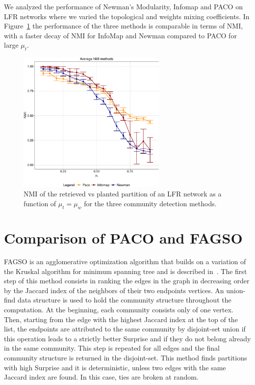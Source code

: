 We analyzed the performance of Newman's Modularity, Infomap and PACO on LFR networks where we varied the topological and weights mixing coefficients.
In Figure~\ref{fig:avgmutmuw} the performance of the three methods is comparable in terms of NMI, with a faster decay of NMI for InfoMap and Newman compared to PACO for large $\mu_t$.

\begin{figure}[htb!]
\centering
\includegraphics[width=0.65\textwidth]{images/avg_nmi_allmethods_lfr_errorbars.pdf}
\caption{NMI of the retrieved vs planted partition of an LFR network as a function of $\mu_t=\mu_w$ for the three community detection methods.}
\label{fig:avgmutmuw}
\end{figure}

\section{Comparison of PACO and FAGSO}
FAGSO is an agglomerative optimization algorithm that builds on a variation of the Kruskal algorithm for minimum spanning tree and is described in~\cite{nicolini2016}. The first step of this method consists in ranking the edges in the graph in decreasing order by the Jaccard index of the neighbors of their two endpoints vertices. An union-find data structure is used to hold the community structure throughout the computation. At the beginning, each community consists only of one vertex. Then, starting from the edge with the highest Jaccard index at the top of the list, the endpoints are attributed to the same community by disjoint-set union if this operation leads to a strictly better Surprise and if they do not belong already in the same community. This step is repeated for all edges and the final community structure is returned in the disjoint-set. This method finds partitions with high Surprise and it is deterministic, unless two edges with the same Jaccard index are found. In this case, ties are broken at random. 

